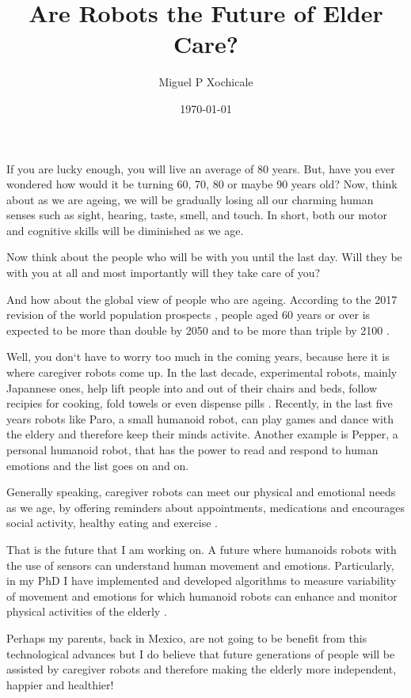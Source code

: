 \documentclass[11pt]{article}
\author{Miguel P Xochicale}
\title{ Are Robots the Future of Elder Care?  }
\date{\today}
\begin{document}
\maketitle

If you are lucky enough, you will live an average of 80 years.
But, have you ever wondered how would it be turning 60, 70, 80 or maybe 90 years old?
Now, think about as we are ageing, we will be gradually losing all our
charming human senses such as sight, hearing, taste, smell, and touch.
In short, both our motor and cognitive skills will be diminished as we age.

Now think about the people who will be with you until the last day.
Will they be with you at all 
and most importantly will they take care of you?

And how about the global view of people who are ageing.
According to the 2017 revision of the world population prospects \cite{un2017}, 
people aged 60 years or over
is expected to be more than double by 2050 and to be more than triple by 2100 \cite{unb2017}.

Well, you don`t have to worry too much in the coming years, 
because here it is where caregiver robots come up.
In the last decade, experimental robots, mainly Japannese ones, help lift people into and out of their chairs and beds,
follow recipies for cooking, fold towels or even dispense pills \cite{matuszek2017}.
Recently, in the last five years robots like
Paro, a small humanoid robot, can play games and dance with the eldery
and therefore keep their minds activite.
Another example is Pepper, a personal humanoid robot, that has the power 
to read and respond to human emotions \cite{hay2015}
and the list goes on and on.

Generally speaking, caregiver robots can meet our physical and emotional needs as we age,
by offering reminders about appointments, medications 
and encourages social activity, healthy eating and exercise \cite{aronson2014}.

That is the future that I am working on.
A future where humanoids robots with the use of sensors can understand human movement and emotions.
Particularly, in my PhD I have implemented and developed algorithms to measure 
variability of movement and emotions 
for which humanoid robots can enhance and monitor physical activities of the elderly \cite{xochicale2018}.

Perhaps my parents, back in Mexico, are not going to be benefit 
from this technological advances 
but I do believe that future generations of people will be assisted by caregiver robots
and therefore making the elderly more independent, happier and healthier!
\end{document}
